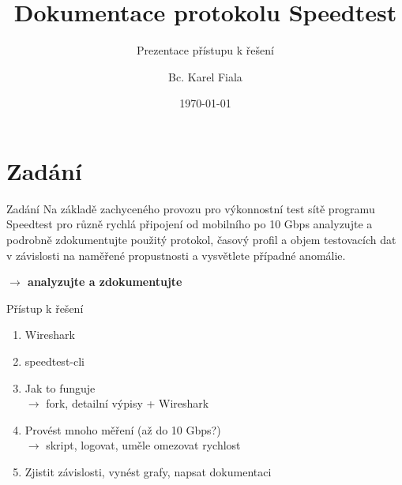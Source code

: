 \documentclass{beamer}
\title[Dokumentace protokolu Speedtest]{Dokumentace protokolu Speedtest}
\subtitle[Prezentace přístupu k řešení]{Prezentace přístupu k řešení}
\author[Bc. Karel Fiala]{Bc. Karel Fiala}
\institute[ČVUT FIT]{
   Fakulta informačních technologií \\
   České vysoké učení technické v~Praze
 }
\date{\today}
\begin{document}
\begin{frame}
   \titlepage
\end{frame}




\section{Zadání}
\begin{frame}{Zadání}
Na základě zachyceného provozu pro výkonnostní test sítě programu Speedtest pro různě rychlá připojení od mobilního po 10 Gbps analyzujte a podrobně zdokumentujte použitý protokol, časový profil a objem testovacích dat v závislosti na naměřené propustnosti a vysvětlete případné anomálie.

\bigskip

\hfill \textbf{$\rightarrow$ analyzujte a zdokumentujte} \hfill \hfill

\end{frame}


\begin{frame}{Přístup k řešení}
\begin{enumerate}
\item Wireshark
\bigskip
\item speedtest-cli
\bigskip
\item Jak to funguje\\ $\rightarrow$ fork, detailní výpisy + Wireshark
\bigskip
\item Provést mnoho měření (až do 10 Gbps?)\\ $\rightarrow$ skript, logovat, uměle omezovat rychlost
\bigskip
\item Zjistit závislosti, vynést grafy, napsat dokumentaci
\end{enumerate}

\end{frame}


\end{document}
